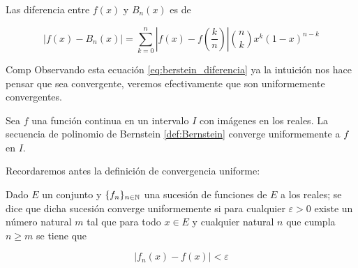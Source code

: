 Las diferencia entre $f(x)$ y $B_n(x)$ es de


\begin{equation} \label{eq:berstein_diferencia}
    |f(x)-B_n(x)| = \sum_{k=0}^n \left|f(x) - f \left( \frac{k}{n} \right)\right|
    \binom{n}{k} x^{k} (1-x)^{n-k}
\end{equation} 

Comp
Observando esta ecuación \eqref{eq:berstein_diferencia} ya la intuición nos 
hace pensar que sea convergente, veremos efectivamente que son uniformemente convergentes. 

\begin{teorema}\label{teo:aproximacion_bernstein}

    Sea $f$ una función continua en un intervalo $I$ con imágenes en los reales. 
    La secuencia de polinomio de Bernstein
    \ref{def:Bernstein} converge uniformemente a $f$ en $I.$
    
\end{teorema}
Recordaremos antes la definición de convergencia uniforme: 

\begin{definicion}

    Dado $E$ un conjunto y $\{f_n\}_{n \in \mathbb{N}}$ una sucesión de funciones de $E$
     a los reales; se dice 
    que dicha sucesión converge uniformemente si para cualquier $\varepsilon > 0$ existe un número natural $m$ tal que 
    para todo $x   \in E$ y cualquier natural $n$ que cumpla $n \geq m$ se tiene que 

    \begin{equation*}
        |f_n(x) - f(x) | < \varepsilon
    \end{equation*}
    
\end{definicion}

